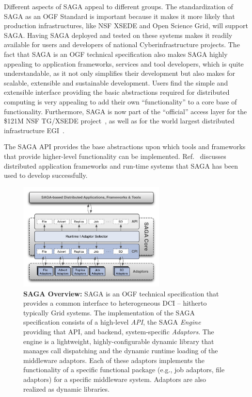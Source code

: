 \documentclass[]{svjour3}
\begin{document}
 Different aspects of SAGA appeal to
different groups. The standardization of SAGA as an OGF Standard is
important because it makes it more likely that production
infrastructures, like NSF XSEDE and Open Science Grid, will support
SAGA. Having SAGA deployed and tested on these systems makes it
readily available for users and developers of national
Cyberinfrastructure projects. The fact that SAGA is an OGF technical
specification also makes SAGA highly appealing to application
frameworks, services and tool developers, which is quite
understandable, as it not only simplifies their development but also
makes for scalable, extensible and sustainable development. Users find
the simple and extensible interface providing the basic abstractions
required for distributed computing is very appealing to add their own
“functionality” to a core base of functionality. Furthermore, SAGA is
now part of the “official” access layer for the \$121M NSF TG/XSEDE
project~, as well as for the world largest
distributed infrastructure EGI~.

The SAGA API provides the base abstractions upon which tools and
frameworks that provide higher-level functionality can be
implemented. Ref.~\cite{saga_url} discusses distributed application
frameworks and run-time systems that SAGA has been used to develop
successfully. 


\begin{figure}[t]
\centering \includegraphics[width=0.66\textwidth]{figures/saga-architecture-1.png}
\caption{\textbf{SAGA Overview: } SAGA is an OGF technical
  specification that provides a common interface to heterogeneous DCI
  -- hitherto typically Grid systems.  The implementation of the
  SAGA\cite{saga_url} specification consists of a high-level {\it
    API}, the SAGA {\it Engine} providing that API, and backend,
  system-specific {\it Adaptors}.  The engine is a lightweight,
  highly-configurable dynamic library that manages call dispatching
  and the dynamic runtime loading of the middleware adaptors.  Each of
  these adaptors implements the functionality of a specific functional
  package (e.g., job adaptors, file adaptors) for a specific
  middleware system. Adaptors are also realized as dynamic libraries.}
 \label{fig:saga-overview}
\end{figure}
\end{document}
